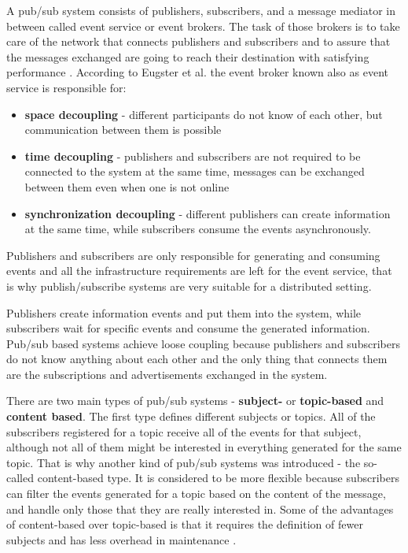 \documentclass{sigplanconf}
\begin{document}
A pub/sub system consists of publishers, subscribers, and a message mediator in between called event service or event brokers. The task of those brokers is to take care of the network that connects publishers and subscribers and to assure that the messages exchanged are going to reach their destination with satisfying performance \cite{pubsub1}. According to  Eugster et al. \cite{pubsub4} the event broker known also as event service is responsible for:

\begin{itemize} \itemsep1pt \parskip0pt 
  \item \textbf{space decoupling} - different participants do not know of each other, but communication between them is possible
  \item \textbf{time decoupling} - publishers and subscribers are not required to be connected to the system at the same time, messages can be exchanged between them even when one is not online
  \item \textbf{synchronization decoupling} - different publishers can create information at the same time, while subscribers consume the events asynchronously.
\end{itemize}

Publishers and subscribers are only responsible for generating and consuming events and all the infrastructure requirements are left for the event service, that is why publish/subscribe systems are very suitable for a distributed setting.

Publishers create information events and put them into the system, while subscribers wait for specific events and consume the generated information. Pub/sub based systems achieve loose coupling because publishers and subscribers do not know anything about each other and the only thing that connects them are the subscriptions and advertisements exchanged in the system.

There are two main types of pub/sub systems - \textbf{subject-} or \textbf{topic-based} and \textbf{content based}. The first type defines different subjects or topics. All of the subscribers registered for a topic receive all of the events for that subject, although not all of them might be interested in everything generated for the same topic. That is why another kind of pub/sub systems was introduced - the so-called content-based type. It is considered to be more flexible because subscribers can filter the events generated for a topic based on the content of the message, and handle only those that they are really interested in. Some of the advantages of content-based over topic-based is that it requires the definition of fewer subjects and has less overhead in maintenance \cite{pubsuburl}.
\end{document}
